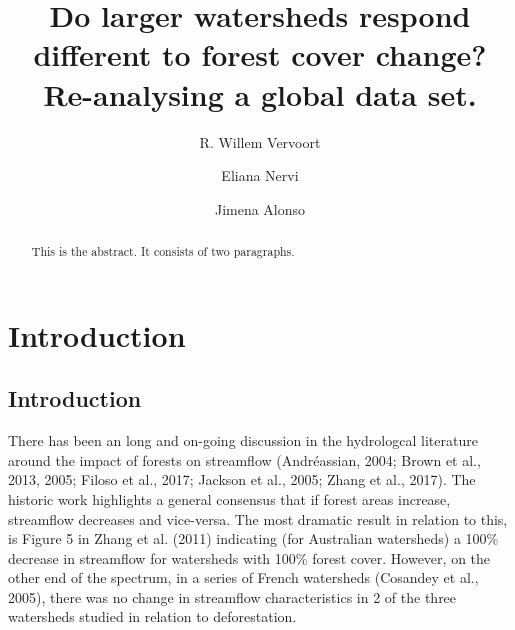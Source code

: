 \documentclass[]{elsarticle} %
\begin{document}
\begin{frontmatter}

  \title{Do larger watersheds respond different to forest cover change?
Re-analysing a global data set.}
    \author[The University of Sydney, INIA]{R. Willem Vervoort}
    \author[INIA]{Eliana Nervi}
    \author[IMFIA]{Jimena Alonso}
      \address[The University of Sydney]{School of Life and Environmental Sciences, The University of Sydney,
Sydney, NSW 2006, Australia}
    \address[INIA]{Instituto Nacional de Investigación Agropecuaria, INIA-Uruguay, Ruta 48
km 10, Rincon del Colorado, 90100 Canelones, Uruguay}
    \address[IMFIA]{Institute of Fluid Mechanics and Environmental Engineering, School of
Engineering, Universidad de la República, 11200 Montevideo, Uruguay}
  
  \begin{abstract}
  This is the abstract. It consists of two paragraphs.
  \end{abstract}
  
 \end{frontmatter}

\hypertarget{introduction}{%
\section{Introduction}\label{introduction}}

\hypertarget{introduction-1}{%
\subsection{Introduction}\label{introduction-1}}

There has been an long and on-going discussion in the hydrologcal
literature around the impact of forests on streamflow (Andréassian,
2004; Brown et al., 2013, 2005; Filoso et al., 2017; Jackson et al.,
2005; Zhang et al., 2017). The historic work highlights a general
consensus that if forest areas increase, streamflow decreases and
vice-versa. The most dramatic result in relation to this, is Figure 5 in
Zhang et al. (2011) indicating (for Australian watersheds) a 100\%
decrease in streamflow for watersheds with 100\% forest cover. However,
on the other end of the spectrum, in a series of French watersheds
(Cosandey et al., 2005), there was no change in streamflow
characteristics in 2 of the three watersheds studied in relation to
deforestation.
\end{document}
